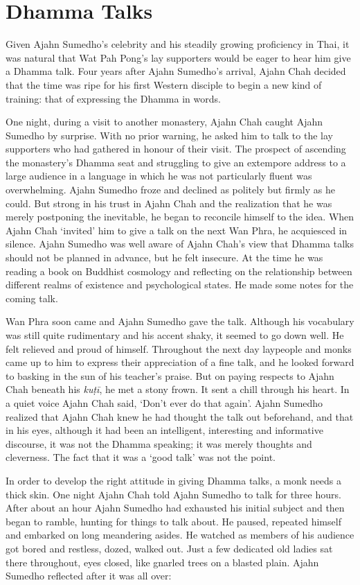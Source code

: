 \section{Dhamma Talks}

Given Ajahn Sumedho's celebrity and his steadily growing proficiency in
Thai, it was natural that Wat Pah Pong's lay supporters would be eager
to hear him give a Dhamma talk. Four years after Ajahn Sumedho's
arrival, Ajahn Chah decided that the time was ripe for his first Western
disciple to begin a new kind of training: that of expressing the Dhamma
in words. 

One night, during a visit to another monastery, Ajahn Chah caught Ajahn
Sumedho by surprise. With no prior warning, he asked him to talk to the
lay supporters who had gathered in honour of their visit. The prospect
of ascending the monastery's Dhamma seat and struggling to give an
extempore address to a large audience in a language in which he was not
particularly fluent was overwhelming. Ajahn Sumedho froze and declined
as politely but firmly as he could. But strong in his trust in Ajahn
Chah and the realization that he was merely postponing the inevitable, 
he began to reconcile himself to the idea. When Ajahn Chah `invited' him
to give a talk on the next Wan Phra, he acquiesced in silence. Ajahn
Sumedho was well aware of Ajahn Chah's view that Dhamma talks should not
be planned in advance, but he felt insecure. At the time he was reading
a book on Buddhist cosmology and reflecting on the relationship between
different realms of existence and psychological states. He made some
notes for the coming talk. 

Wan Phra soon came and Ajahn Sumedho gave the talk. Although his
vocabulary was still quite rudimentary and his accent shaky, it seemed
to go down well. He felt relieved and proud of himself. Throughout the
next day laypeople and monks came up to him to express their
appreciation of a fine talk, and he looked forward to basking in the sun
of his teacher's praise. But on paying respects to Ajahn Chah beneath
his \emph{kuṭī}, he met a stony frown. It sent a chill through his
heart. In a quiet voice Ajahn Chah said, `Don't ever do that again'. 
Ajahn Sumedho realized that Ajahn Chah knew he had thought the talk out
beforehand, and that in his eyes, although it had been an intelligent, 
interesting and informative discourse, it was not the Dhamma speaking; 
it was merely thoughts and cleverness. The fact that it was a `good
talk' was not the point. 

In order to develop the right attitude in giving Dhamma talks, a
monk needs a thick skin. One night Ajahn Chah told Ajahn Sumedho to talk
for three hours. After about an hour Ajahn Sumedho had exhausted his
initial subject and then began to ramble, hunting for things to talk
about. He paused, repeated himself and embarked on long meandering
asides. He watched as members of his audience got bored and restless, 
dozed, walked out. Just a few dedicated old ladies sat there throughout, 
eyes closed, like gnarled trees on a blasted plain. Ajahn Sumedho
reflected after it was all over: 

